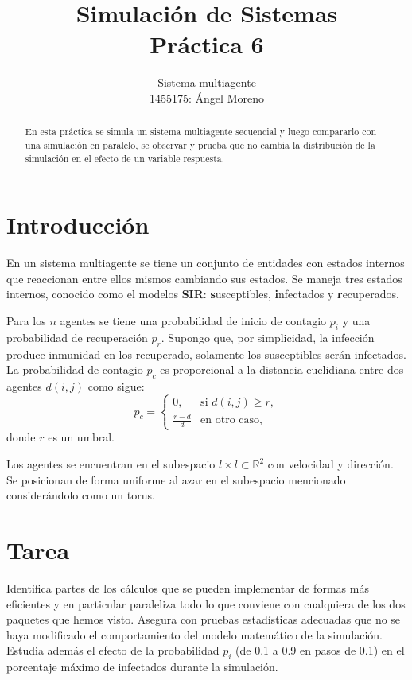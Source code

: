 \documentclass[10pt,a4paper]{article}
\author{Sistema multiagente \\ 1455175: Ángel Moreno}
\title{Simulación de Sistemas \\ Práctica 6}
\begin{document}
\maketitle

\begin{abstract}
En esta práctica se simula un sistema multiagente secuencial y luego compararlo con una simulación en paralelo, se observar y prueba que no cambia la distribución de la simulación en el efecto de un variable respuesta.
\end{abstract}

\section{Introducción}

En un sistema multiagente se tiene un conjunto de entidades con estados internos que reaccionan entre ellos mismos cambiando sus estados. Se maneja tres estados internos, conocido como el modelos \textbf{SIR}: \textbf{s}usceptibles, \textbf{i}nfectados y \textbf{r}ecuperados.

Para los $n$ agentes se tiene una probabilidad de inicio de contagio $p_{i}$ y una probabilidad de recuperación $p_{r}$. Supongo que, por simplicidad, la infección produce inmunidad en los recuperado, solamente los susceptibles serán infectados. La probabilidad de contagio $p_{c}$ es proporcional a la distancia euclidiana entre dos agentes $d(i, j)$ como sigue:
\[ p_{c} = 
	\begin{cases}
	0, & \text{si } d(i, j) \geq r, \\
	\frac{r - d}{d} & \text{en otro caso,}
	\end{cases}
\]
donde $r$ es un umbral.

Los agentes se encuentran en el subespacio $\mathit{l} \times \mathit{l} \subset \mathbb{R}^{2}$ con  velocidad y dirección. Se posicionan de forma uniforme al azar en el subespacio mencionado considerándolo como un torus.

\section{Tarea}

Identifica partes de los cálculos que se pueden implementar de formas más eficientes y en particular paraleliza todo lo que conviene con cualquiera de los dos paquetes que hemos visto. Asegura con pruebas estadísticas adecuadas que no se haya modificado el comportamiento del modelo matemático de la simulación. Estudia además el efecto de la probabilidad $p_{i}$ (de 0.1 a 0.9 en pasos de 0.1) en el porcentaje máximo de infectados durante la simulación.
\end{document}
